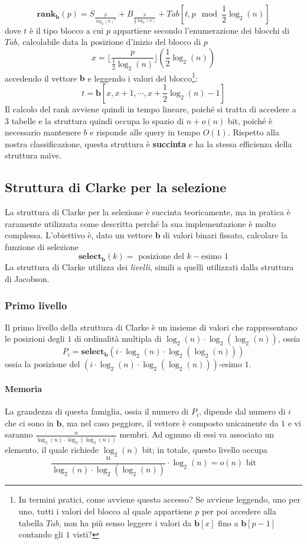 $$
	\mathbf{rank}_{\mathbf{b}}(p) = S_{\frac{p}{\log_2(n)^2}} + B_{\frac{p}{\frac{1}{2}\log_2(n)}}
	+ Tab[t, p \mod \frac{1}{2}\log_2(n)]
$$
dove $t$ è il tipo blocco a cui $p$ appartiene secondo l'enumerazione dei blocchi di
$Tab$, calcolabile data la posizione d'inizio del blocco di $p$
$$
	x = \lfloor \frac{p}{\frac{1}{2}\log_2(n)}\rfloor (\frac{1}{2}\log_2(n))
$$
accedendo il vettore $\mathbf{b}$ e leggendo i valori del blocco\footnote{
	In termini pratici, come avviene questo accesso? Se avviene leggendo,
	uno per uno, tutti i valori del blocco al quale appartiene $p$ per poi
	accedere alla tabella $Tab$, non ha più senso leggere i valori da
	$\mathbf{b}[x]$ fino a $\mathbf{b}[p-1]$ contando gli $1$ visti?
}:
$$
	t = \mathbf{b}[x, x +1, \cdots, x + \frac{1}{2} \log_2(n) -1 ]
$$
Il calcolo del rank avviene quindi in tempo lineare,
poiché si tratta di accedere a $3$ tabelle e la struttura quindi
occupa lo spazio di $n + o(n)$ bit, poiché è necessario mantenere $b$ e
risponde alle query in tempo $O(1)$. Rispetto alla nostra classificazione,
questa struttura è \textbf{succinta} e ha la stessa efficienza della struttura naïve.

\subsection{Struttura di Clarke per la selezione}
La struttura di Clarke per la selezione è succinta teoricamente, ma in pratica
è raramente utilizzata come descritta perché la sua implementazione è molto
complessa.
L'obiettivo è, dato un vettore $\mathbf{b}$ di valori binari fissato, calcolare
la funzione di selezione
$$
	\mathbf{select_b}(k) = \text{ posizione del } k-\text{esimo } 1
$$
La struttura di Clarke utilizza dei \textit{livelli}, simili a quelli utilizzati
dalla struttura di Jacobson.

\subsubsection{Primo livello}
Il primo livello della struttura di Clarke è un insieme
di valori che rappresentano le posizioni degli $1$ di ordinalità multipla di
$\log_2(n) \cdot \log_2(\log_2(n))$, ossia
$$
	P_i =  \mathbf{select_b}(i \cdot \log_2(n) \cdot \log_2(\log_2(n)))
$$
ossia la posizione del $(i \cdot \log_2(n) \cdot \log_2(\log_2(n)))$-esimo $1$.

\paragraph{Memoria}
La grandezza di questa famiglia, ossia il numero di $P_i$, dipende dal
numero di $i$ che ci sono in $\mathbf{b}$, ma nel caso peggiore, il vettore
è composto unicamente da $1$ e vi saranno $\frac{n}{\log_2(n) \cdot \log_2(\log_2(n))}$ membri.
Ad ognuno di essi va associato un elemento, il quale richiede $\log_2(n)$ bit;
in totale, questo livello occupa
$$
	\frac{n}{\log_2(n) \cdot \log_2(\log_2(n))} \cdot \log_2(n) = o(n) \text{ bit}
$$

